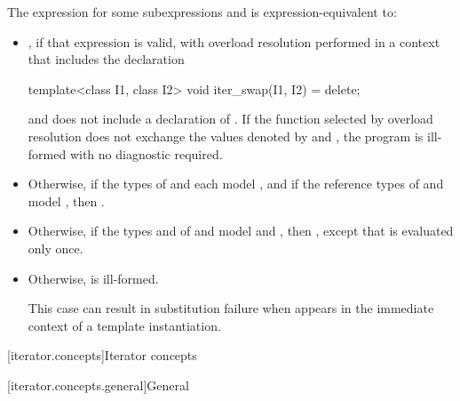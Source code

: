 \pnum
The expression  for some subexpressions
 and  is expression-equivalent to:
\begin{itemize}
\item {}, if that expression is valid,
with overload resolution performed in a context that includes the declaration
\begin{codeblock}
template<class I1, class I2>
  void iter_swap(I1, I2) = delete;
\end{codeblock}
and does not include a declaration of .
If the function selected by overload resolution does not exchange the values
denoted by  and , the program is
ill-formed with no diagnostic required.

\item Otherwise, if the types of  and  each model
, and if the reference types of  and 
model ,
then .

\item Otherwise, if the types  and  of  and
 model  and
, then
,
except that  is evaluated only once.

\item Otherwise,  is ill-formed.
\begin{note}
This case can result in substitution failure when 
appears in the immediate context of a template instantiation.
\end{note}
\end{itemize}

[iterator.concepts]{Iterator concepts}

[iterator.concepts.general]{General}

